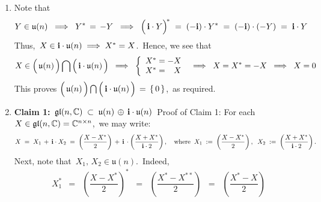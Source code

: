 \begin{enumerate}
\item
    Note that
    \begin{equation*}
    Y \in \mathfrak{u}(n)
    \;\;\Longrightarrow\;\;
        Y^{*} \, = \, -Y
    \;\;\Longrightarrow\;\;
        \left(\,\overset{{\color{white}.}}{\i \cdot Y}\right)^{\!*}
        \; = \;
        (-\i) \cdot Y^{*}
        \; = \;
        (-\i) \cdot (-Y)
        \; = \;
        \i \cdot Y
    \end{equation*}
    Thus,
    \,$X \in \mathbf{i} \cdot \mathfrak{u}(n) \;\Longrightarrow\; X^{*} = X$.\,
    Hence, we see that 
    \begin{equation*}
    X \in
        \left(\,\overset{{\color{white}.}}{\mathfrak{u}(n)}\,\right)
        \bigcap
        \left(\,\overset{{\color{white}.}}{\i\cdot\mathfrak{u}(n)}\,\right)
    \;\;\Longrightarrow\;\;
        \left\{\begin{array}{c}
            X^{*} = -X
            \\
            X^{*} = {\color{white}-}X
            \end{array}\right.
    \;\;\Longrightarrow\;\;
        X = X^{*} = -X
    \;\;\Longrightarrow\;\;
        X = 0
    \end{equation*}
    This proves
    $
    \left(\,\overset{{\color{white}.}}{\mathfrak{u}(n)}\,\right)
    \bigcap
    \left(\,\overset{{\color{white}.}}{\i\cdot\mathfrak{u}(n)}\,\right)
    \, = \,
    \{\,0\,\}
    $,\,
    as required.
\item
    \textbf{Claim 1:}\;
    \,$\mathfrak{gl}(n,\mathbb{C}) \;\subset\; \mathfrak{u}(n) \,\oplus\, \mathbf{i}\cdot\mathfrak{u}(n)$\,
    \vskip 0.1cm
    \noindent
    Proof of Claim 1:\;
    For each \,$X \in \mathfrak{gl}(n,\mathbb{C}) = \mathbb{C}^{n \times n}$,\, we may write:
    \begin{equation*}
    X
    \; = \;
        X_{1} \,+\, \mathbf{i} \cdot X_{2}
    \; = \;
        \left(\dfrac{X - X^{*}}{2}\right)
        \,+\,
        \mathbf{i}\,\cdot\left(\dfrac{X + X^{*}}{\mathbf{i} \cdot 2}\right),
    \quad
    \textnormal{where}\;\;
    X_{1}
    \; := \;
        \left(\dfrac{X - X^{*}}{2}\right),
    \;\;
    X_{2}
    \; := \;
        \left(\dfrac{X + X^{*}}{\mathbf{i} \cdot 2}\right).
    \end{equation*}
    Next, note that \,$X_{1},\, X_{2} \in \mathfrak{u}(n)$.\,
    Indeed,
    \begin{eqnarray*}
    X_{1}^{*}
    & = &
        \left(\dfrac{X - X^{*}}{2}\right)^{\!*}
    \;\; = \;\;
        \left(\dfrac{X^{*} - X^{**}}{2}\right)
    \;\; = \;\;
        \left(\dfrac{X^{*} - X}{2}\right)

\end{eqnarray*}
\end{enumerate}

